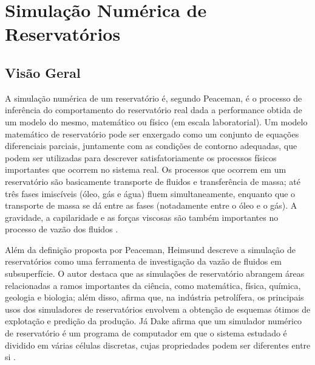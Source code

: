 
\section{Simula\c{c}\~{a}o Num\'{e}rica de Reservat\'{o}rios}
\subsection{Visão Geral}
A simula\c{c}\~{a}o num\'{e}rica de um reservat\'{o}rio \'{e}, segundo Peaceman, \'{e} o processo de infer\^{e}ncia do comportamento do reservat\'{o}rio real dada a performance obtida de um modelo do mesmo, matem\'{a}tico ou f\'{i}sico (em escala laboratorial). Um modelo matem\'{a}tico de reservat\'{o}rio pode ser enxergado como um conjunto de equa\c{c}\~{o}es diferenciais parciais, juntamente com as condi\c{c}\~{o}es de contorno adequadas, que podem ser utilizadas para descrever satisfatoriamente os processos f\'{i}sicos importantes que ocorrem no sistema real. Os processos que ocorrem em um reservat\'{o}rio s\~{a}o basicamente transporte de fluidos e transfer\^{e}ncia de massa; at\'{e} tr\^{e}s fases imisc\'{i}veis (\'{o}leo, g\'{a}s e \'{a}gua) fluem simultaneamente, enquanto que o transporte de massa se d\'{a} entre as fases (notadamente entre o \'{o}leo e o g\'{a}s). A gravidade, a capilaridade e as for\c{c}as viscosas s\~{a}o tamb\'{e}m importantes no processo de vaz\~{a}o dos fluidos \cite{simres}.

Além da definição proposta por Peaceman, Heimsund descreve a simulação de reservatórios como uma ferramenta de investigação da vazão de fluidos em subsuperfície. O autor destaca que as simulações de reservatório abrangem áreas relacionadas a ramos importantes da ciência, como matemática, física, química, geologia e biologia; além disso, afirma que, na indústria petrolífera, os principais usos dos simuladores de reservatórios envolvem a obtenção de esquemas ótimos de explotação e predição da produção\cite{heimsund2005}. Já Dake afirma que um simulador numérico de reservatório é um programa de computador em que o sistema estudado é dividido em várias células discretas, cujas propriedades podem ser diferentes entre si \cite{dake}.

